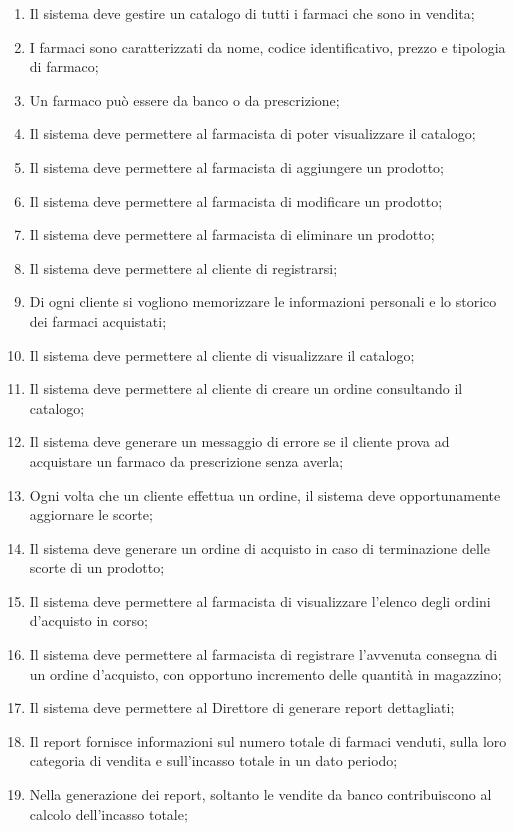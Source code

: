 \begin{enumerate}
	\item Il sistema deve gestire un catalogo di tutti i farmaci che sono in vendita;
	\item I farmaci sono caratterizzati da nome, codice identificativo, prezzo e tipologia di farmaco;
	\item Un farmaco può essere da banco o da prescrizione;
	\item Il sistema deve permettere al farmacista di poter visualizzare il catalogo;
	\item Il sistema deve permettere al farmacista di aggiungere un prodotto;
	\item Il sistema deve permettere al farmacista di modificare un prodotto;
	\item Il sistema deve permettere al farmacista di eliminare un prodotto;
	\item Il sistema deve permettere al cliente di registrarsi;
	\item Di ogni cliente si vogliono memorizzare le informazioni personali e lo storico dei farmaci acquistati;
	\item Il sistema deve permettere al cliente di visualizzare il catalogo;
	\item Il sistema deve permettere al cliente di creare un ordine consultando il catalogo;
	\item Il sistema deve generare un messaggio di errore se il cliente prova ad acquistare un farmaco da prescrizione senza averla;
	\item Ogni volta che un cliente effettua un ordine, il sistema deve opportunamente aggiornare le scorte;
	\item Il sistema deve generare un ordine di acquisto in caso di terminazione delle scorte di un prodotto;
	\item Il sistema deve permettere al farmacista di visualizzare l'elenco degli ordini d'acquisto in corso;
	\item Il sistema deve permettere al farmacista di registrare l'avvenuta consegna di un ordine d'acquisto, con opportuno incremento delle quantità in magazzino;
	\item Il sistema deve permettere al Direttore di generare report dettagliati;
	\item Il report fornisce informazioni sul numero totale di farmaci venduti, sulla loro categoria di vendita e sull'incasso totale in un dato periodo;
	\item Nella generazione dei report, soltanto le vendite da banco contribuiscono al calcolo dell'incasso totale;
\end{enumerate}

